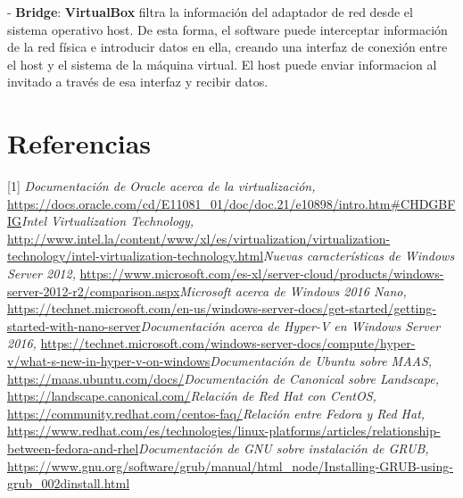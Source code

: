 - \textbf{Bridge}: \textbf{VirtualBox} filtra la información del adaptador de red desde el sistema operativo host. De esta forma, el software puede interceptar información de la red física e introducir datos en ella, creando una interfaz de conexión entre el host y el sistema de la máquina virtual. El host puede enviar informacion al invitado a través de esa interfaz y recibir datos.


\section{Referencias}

[1] \textit{Documentación de Oracle acerca de la virtualización, } 
\url{https://docs.oracle.com/cd/E11081_01/doc/doc.21/e10898/intro.htm#CHDGBFIG}\newline
[2] \textit{Intel Virtualization Technology, }
\url{http://www.intel.la/content/www/xl/es/virtualization/virtualization-technology/intel-virtualization-technology.html}\newline
[3] \textit{Nuevas características de Windows Server 2012, }\newline
\url{https://www.microsoft.com/es-xl/server-cloud/products/windows-server-2012-r2/comparison.aspx}\newline
[4] \textit{Microsoft acerca de Windows 2016 Nano, }
\url{https://technet.microsoft.com/en-us/windows-server-docs/get-started/getting-started-with-nano-server}\newline
[5] \textit{Documentación acerca de Hyper-V en Windows Server 2016, }
\url{https://technet.microsoft.com/windows-server-docs/compute/hyper-v/what-s-new-in-hyper-v-on-windows}\newline
[6] \textit{Documentación de Ubuntu sobre MAAS, }
\url{https://maas.ubuntu.com/docs/}\newline
[7] \textit{Documentación de Canonical sobre Landscape, }
\url{https://landscape.canonical.com/}\newline
[8] \textit{Relación de Red Hat con CentOS, }
\url{https://community.redhat.com/centos-faq/}\newline
[9] \textit{Relación entre Fedora y Red Hat, }
\url{https://www.redhat.com/es/technologies/linux-platforms/articles/relationship-between-fedora-and-rhel}\newline
[10] \textit{Documentación de GNU sobre instalación de GRUB, }
\url{https://www.gnu.org/software/grub/manual/html_node/Installing-GRUB-using-grub_002dinstall.html}\newline
